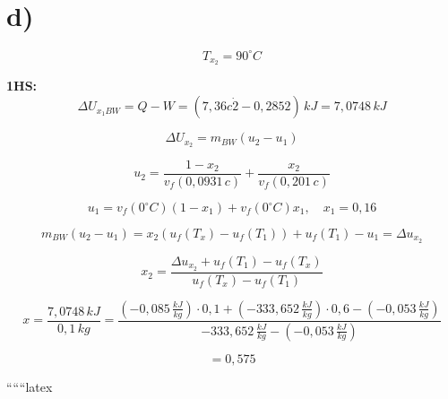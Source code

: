 

\section*{d)}

\[
T_{x_2} = 90^\circ C
\]

\textbf{1HS:}
\[
\Delta U_{x_1 BW} = Q - W = (7,36c\dot{2} - 0,2852) \, kJ = 7,0748 \, kJ
\]

\[
\Delta U_{x_2} = m_{BW} (u_2 - u_1)
\]

\[
u_2 = \frac{1 - x_2}{v_f (0,0931 \, c)} + \frac{x_2}{v_f (0,201 \, c)}
\]

\[
u_1 = v_f (0^\circ C) (1 - x_1) + v_f (0^\circ C) x_1, \quad x_1 = 0,16
\]

\[
m_{BW} (u_2 - u_1) = x_2 (u_f (T_x) - u_f (T_1)) + u_f (T_1) - u_1 = \Delta u_{x_2}
\]

\[
x_2 = \frac{\Delta u_{x_2} + u_f (T_1) - u_f (T_x)}{u_f (T_x) - u_f (T_1)}
\]

\[
x = \frac{7,0748 \, kJ}{0,1 \, kg} = \frac{(-0,085 \, \frac{kJ}{kg}) \cdot 0,1 + (-333,652 \, \frac{kJ}{kg}) \cdot 0,6 - (-0,053 \, \frac{kJ}{kg})}{-333,652 \, \frac{kJ}{kg} - (-0,053 \, \frac{kJ}{kg})}
\]

\[
= 0,575
\]

``````latex